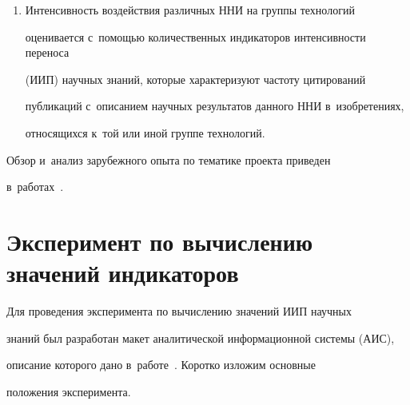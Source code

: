 \begin{enumerate}[1.]
выявить информационные связи между различными ННИ 


и~группами технологий. Такие связи могут 


свидетельствовать об использовании результатов этих исследований. Сам факт 


цитирования в~изобретении научных публикаций по какому-либо ННИ может 


говорить о потенциальном воздействии данного ННИ на ту группу технологий, 


к~которой относится это изобретение. Чем чаще результаты данного ННИ 


цитируются, тем, скорее всего, значимее степень его воздействия на развитие 


анализируемой группы технологий.


\item Интенсивность воздействия различных ННИ на группы технологий 


оценивается с~помощью количественных индикаторов интенсивности переноса 


(ИИП) научных знаний, которые характеризуют частоту цитирований 


пуб\-ли\-ка\-ций с~описанием научных результатов данного ННИ в~изобретениях, 


относящихся к~той или иной группе технологий.


\end{enumerate}





     Обзор и~анализ зарубежного опыта по тематике проекта приведен 


в~работах~\cite{2-mins, 7-mins, 8-mins}.





\section{Эксперимент по вычислению значений индикаторов}


      


     Для проведения эксперимента по вычислению значений ИИП научных 


знаний был разработан макет аналитической информационной системы (АИС), 


описание которого дано в~работе~\cite{3-mins}. Коротко изложим основные 


положения эксперимента.


